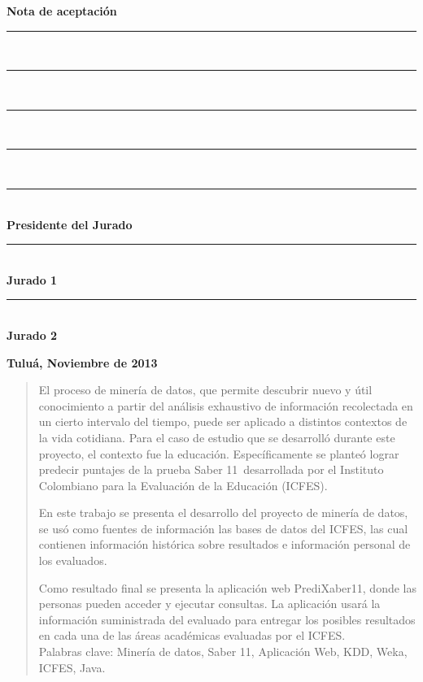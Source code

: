 \thispagestyle{fancy}
\setcounter{page}{3}

\begin{huge}
\textbf{Nota de aceptación}
\end{huge} 
\vfill
\begin{Large}
\begin{flushright}
\rule{100mm}{0.05mm}\\
\rule{100mm}{0.05mm}\\
\rule{100mm}{0.05mm}\\
\rule{100mm}{0.05mm}\\
\rule{100mm}{0.05mm}\\
\textbf{Presidente
del Jurado}\\[2.0cm]
\rule{100mm}{0.05mm}\\\textbf{Jurado 1}\vfill
\rule{100mm}{0.05mm}\\\textbf{Jurado 2}\vfill
\end{flushright}
\begin{flushleft}
\large \textbf{Tuluá, Noviembre de 2013}
\end{flushleft}
\end{Large}
\newpage


\begin{abstract}
\thispagestyle{fancy}
\setcounter{page}{4}
\justifying
El proceso de minería de datos, que permite descubrir nuevo y útil conocimiento a partir del análisis exhaustivo de información recolectada en un cierto intervalo del tiempo, puede ser aplicado a distintos contextos de la vida cotidiana. Para el caso de estudio que se desarrolló durante este proyecto, el contexto fue la educación. Específicamente se planteó lograr predecir puntajes de la prueba Saber 11\degree \ desarrollada por el Instituto Colombiano para la Evaluación de la Educación (ICFES).

En este trabajo se presenta el desarrollo del proyecto de minería de datos, se usó como fuentes de información las bases de datos del ICFES, las cual contienen información histórica sobre resultados e información personal de los evaluados.

Como resultado final se presenta la aplicación web PrediXaber11, donde las personas pueden acceder y ejecutar consultas. La aplicación usará la información suministrada del evaluado para entregar los posibles resultados en cada una de las áreas académicas evaluadas por el ICFES.\\

Palabras clave: Minería de datos, Saber 11\degree, Aplicación Web, KDD, Weka, ICFES, Java.
\end{abstract}
